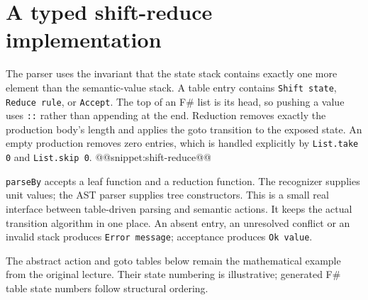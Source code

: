 \section{A typed shift-reduce implementation}
The parser uses the invariant that the state stack contains exactly one more element than the semantic-value stack.
A table entry contains \texttt{Shift state}, \texttt{Reduce rule}, or \texttt{Accept}.
The top of an F\# list is its head, so pushing a value uses \texttt{::} rather than appending at the end.
Reduction removes exactly the production body's length and applies the goto transition to the exposed state.
An empty production removes zero entries, which is handled explicitly by \texttt{List.take 0} and \texttt{List.skip 0}.
@@snippet:shift-reduce@@

\texttt{parseBy} accepts a leaf function and a reduction function.
The recognizer supplies unit values; the AST parser supplies tree constructors.
This is a small real interface between table-driven parsing and semantic actions.
It keeps the actual transition algorithm in one place.
An absent entry, an unresolved conflict or an invalid stack produces \texttt{Error message}; acceptance produces \texttt{Ok value}.

The abstract action and goto tables below remain the mathematical example from the original lecture.
Their state numbering is illustrative; generated F\# table state numbers follow structural ordering.
